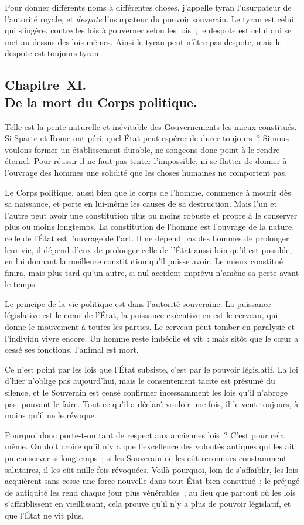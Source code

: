 \documentclass[french,twoside]{book} %
\begin{document}
Pour donner différents noms à différentes choses, j’appelle tyran l’usurpateur de l’autorité royale, et {\itshape despote} l’usurpateur du pouvoir souverain. Le tyran est celui qui s’ingère, contre les lois à gouverner selon les lois ; le despote est celui qui se met au-dessus des lois mêmes. Ainsi le tyran peut n’être pas despote, mais le despote est toujours tyran.
\subsection[{Chapitre XI. De la mort du Corps politique.}]{Chapitre XI. \\
De la mort du Corps politique.}
\noindent Telle est la pente naturelle et inévitable des Gouvernements les mieux constitués. Si Sparte et Rome ont péri, quel État peut espérer de durer toujours ? Si nous voulons former un établissement durable, ne songeons donc point à le rendre éternel. Pour réussir il ne faut pas tenter l’impossible, ni se flatter de donner à l’ouvrage des hommes une solidité que les choses humaines ne comportent pas.\par
Le Corps politique, aussi bien que le corps de l’homme, commence à mourir dès sa naissance, et porte en lui-même les causes de sa destruction. Mais l’un et l’autre peut avoir une constitution plus ou moins robuste et propre à le conserver plus ou moins longtemps. La constitution de l’homme est l’ouvrage de la nature, celle de l’État est l’ouvrage de l’art. Il ne dépend pas des hommes de prolonger leur vie, il dépend d’eux de prolonger celle de l’État aussi loin qu’il est possible, en lui donnant la meilleure constitution qu’il puisse avoir. Le mieux constitué finira, mais plus tard qu’un autre, si nul accident imprévu n’amène sa perte avant le temps.\par
Le principe de la vie politique est dans l’autorité souveraine. La puissance législative est le cœur de l’État, la puissance exécutive en est le cerveau, qui donne le mouvement à toutes les parties. Le cerveau peut tomber en paralysie et l’individu vivre encore. Un homme reste imbécile et vit : mais sitôt que le cœur a cessé ses fonctions, l’animal est mort.\par
Ce n’est point par les lois que l’État subsiste, c’est par le pouvoir législatif. La loi d’hier n’oblige pas aujourd’hui, mais le consentement tacite est présumé du silence, et le Souverain est censé confirmer incessamment les lois qu’il n’abroge pas, pouvant le faire. Tout ce qu’il a déclaré vouloir une fois, il le veut toujours, à moins qu’il ne le révoque.\par
Pourquoi donc porte-t-on tant de respect aux anciennes lois ? C’est pour cela même. On doit croire qu’il n’y a que l’excellence des volontés antiques qui les ait pu conserver si longtemps ; si les Souverain ne les eût reconnues constamment salutaires, il les eût mille fois révoquées. Voilà pourquoi, loin de s’affaiblir, les lois acquièrent sans cesse une force nouvelle dans tout État bien constitué ; le préjugé de antiquité les rend chaque jour plus vénérables ; au lieu que partout où les lois s’affaiblissent en vieillissant, cela prouve qu’il n’y a plus de pouvoir législatif, et que l’État ne vit plus.
\end{document}
